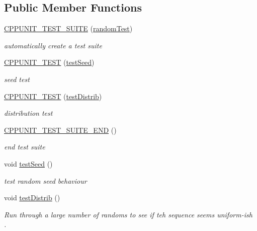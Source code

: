 \subsection*{Public Member Functions}
\begin{DoxyCompactItemize}
\item 
\mbox{\label{classrandomTest_a7cdffcbd64c67232a5cf9a0bc55e3efc}} 
\mbox{\hyperlink{classrandomTest_a7cdffcbd64c67232a5cf9a0bc55e3efc}{C\+P\+P\+U\+N\+I\+T\+\_\+\+T\+E\+S\+T\+\_\+\+S\+U\+I\+TE}} (\mbox{\hyperlink{classrandomTest}{random\+Test}})
\begin{DoxyCompactList}\small\item\em automatically create a test suite \end{DoxyCompactList}\item 
\mbox{\label{classrandomTest_a865784149f2538aba2526748deb2efc8}} 
\mbox{\hyperlink{classrandomTest_a865784149f2538aba2526748deb2efc8}{C\+P\+P\+U\+N\+I\+T\+\_\+\+T\+E\+ST}} (\mbox{\hyperlink{classrandomTest_ae7119042c8ecfe9f350cd5b0d6c11906}{test\+Seed}})
\begin{DoxyCompactList}\small\item\em seed test \end{DoxyCompactList}\item 
\mbox{\label{classrandomTest_a23f99af2cf532cc659e5b3400dfb052f}} 
\mbox{\hyperlink{classrandomTest_a23f99af2cf532cc659e5b3400dfb052f}{C\+P\+P\+U\+N\+I\+T\+\_\+\+T\+E\+ST}} (\mbox{\hyperlink{classrandomTest_ac6d278a9b086e084f8657453b5e63c07}{test\+Distrib}})
\begin{DoxyCompactList}\small\item\em distribution test \end{DoxyCompactList}\item 
\mbox{\label{classrandomTest_a4806098563774b0443bf3e9e994ed904}} 
\mbox{\hyperlink{classrandomTest_a4806098563774b0443bf3e9e994ed904}{C\+P\+P\+U\+N\+I\+T\+\_\+\+T\+E\+S\+T\+\_\+\+S\+U\+I\+T\+E\+\_\+\+E\+ND}} ()
\begin{DoxyCompactList}\small\item\em end test suite \end{DoxyCompactList}\item 
void \mbox{\hyperlink{classrandomTest_ae7119042c8ecfe9f350cd5b0d6c11906}{test\+Seed}} ()
\begin{DoxyCompactList}\small\item\em test random seed behaviour \end{DoxyCompactList}\item 
void \mbox{\hyperlink{classrandomTest_ac6d278a9b086e084f8657453b5e63c07}{test\+Distrib}} ()
\begin{DoxyCompactList}\small\item\em Run through a large number of randoms to see if teh sequence seems uniform-\/ish~\newline
. \end{DoxyCompactList}\end{DoxyCompactItemize}


